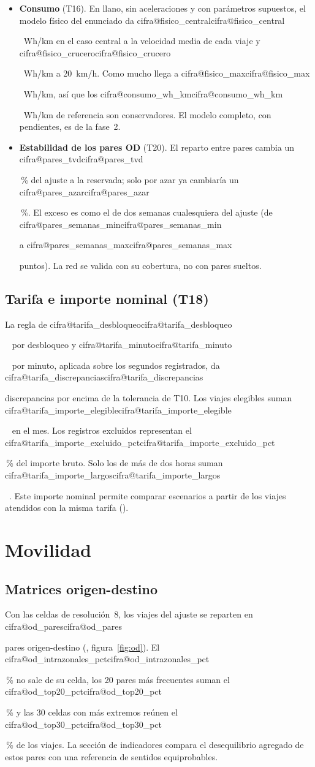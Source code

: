 \documentclass[11pt,a4paper]{article}
\makeatletter
\newcommand\cifra[1]{\ifcsname cifra@#1\endcsname\csname cifra@#1\endcsname
  \else\PackageError{memoria}{Cifra desconocida: \detokenize{#1}}{Revisa generar_cifras.py}\fi}
\newcommand\pc{\,\%}
\makeatother
\begin{document}
\begin{itemize}
        (\cifra{origenes_red_pct}\pc{}).
  \item \textbf{Consumo} (T16). En llano, sin aceleraciones y con parámetros supuestos, el
        modelo físico del enunciado da \cifra{fisico_central}~Wh/km en el caso central a la
        velocidad media de cada viaje y \cifra{fisico_crucero}~Wh/km a 20~km/h. Como mucho
        llega a \cifra{fisico_max}~Wh/km, así que los \cifra{consumo_wh_km}~Wh/km de referencia
        son conservadores. El modelo completo, con pendientes, es de la fase~2.
  \item \textbf{Estabilidad de los pares OD} (T20). El reparto entre pares cambia un
        \cifra{pares_tvd}\pc{} del ajuste a la reservada; solo por azar ya cambiaría un
        \cifra{pares_azar}\pc{}. El exceso es como el de dos semanas cualesquiera del ajuste (de
        \cifra{pares_semanas_min} a \cifra{pares_semanas_max} puntos). La red se valida con su
        cobertura, no con pares sueltos.
\end{itemize}

\subsection{Tarifa e importe nominal (T18)}
La regla de \cifra{tarifa_desbloqueo}~\texteuro{} por desbloqueo y
\cifra{tarifa_minuto}~\texteuro{} por minuto, aplicada sobre los segundos registrados,
da \cifra{tarifa_discrepancias} discrepancias por encima de la tolerancia de T10.
Los viajes elegibles suman \cifra{tarifa_importe_elegible}~\texteuro{} en el mes.
Los registros excluidos representan el \cifra{tarifa_importe_excluido_pct}\pc{} del
importe bruto. Solo los de más de dos horas suman
\cifra{tarifa_importe_largos}~\texteuro{}. Este importe nominal permite comparar
escenarios a partir de los viajes atendidos con la misma tarifa
().

\section{Movilidad}

\subsection{Matrices origen-destino}
Con las celdas de resolución~8, los viajes del ajuste se reparten en \cifra{od_pares} pares
origen-destino (, figura~\ref{fig:od}). El
\cifra{od_intrazonales_pct}\pc{} no sale de su celda, los 20 pares más frecuentes suman el
\cifra{od_top20_pct}\pc{} y las 30 celdas con más extremos reúnen el \cifra{od_top30_pct}\pc{}
de los viajes. La sección de indicadores compara el desequilibrio agregado de estos pares
con una referencia de sentidos equiprobables.
\end{document}

